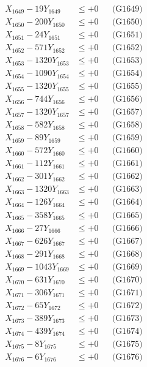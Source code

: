 \documentclass[a4paper,10pt]{article}
\begin{document}
{\begin{align}
X_{1649} - 19Y_{1649} &\leq +0 && \text{(G1649)} \\
X_{1650} - 200Y_{1650} &\leq +0 && \text{(G1650)} \\
\allowbreak
X_{1651} - 24Y_{1651} &\leq +0 && \text{(G1651)} \\
X_{1652} - 571Y_{1652} &\leq +0 && \text{(G1652)} \\
X_{1653} - 1320Y_{1653} &\leq +0 && \text{(G1653)} \\
X_{1654} - 1090Y_{1654} &\leq +0 && \text{(G1654)} \\
X_{1655} - 1320Y_{1655} &\leq +0 && \text{(G1655)} \\
X_{1656} - 744Y_{1656} &\leq +0 && \text{(G1656)} \\
X_{1657} - 1320Y_{1657} &\leq +0 && \text{(G1657)} \\
X_{1658} - 582Y_{1658} &\leq +0 && \text{(G1658)} \\
X_{1659} - 89Y_{1659} &\leq +0 && \text{(G1659)} \\
X_{1660} - 572Y_{1660} &\leq +0 && \text{(G1660)} \\
\allowbreak
X_{1661} - 112Y_{1661} &\leq +0 && \text{(G1661)} \\
X_{1662} - 301Y_{1662} &\leq +0 && \text{(G1662)} \\
X_{1663} - 1320Y_{1663} &\leq +0 && \text{(G1663)} \\
X_{1664} - 126Y_{1664} &\leq +0 && \text{(G1664)} \\
X_{1665} - 358Y_{1665} &\leq +0 && \text{(G1665)} \\
X_{1666} - 27Y_{1666} &\leq +0 && \text{(G1666)} \\
X_{1667} - 626Y_{1667} &\leq +0 && \text{(G1667)} \\
X_{1668} - 291Y_{1668} &\leq +0 && \text{(G1668)} \\
X_{1669} - 1043Y_{1669} &\leq +0 && \text{(G1669)} \\
X_{1670} - 631Y_{1670} &\leq +0 && \text{(G1670)} \\
\allowbreak
X_{1671} - 306Y_{1671} &\leq +0 && \text{(G1671)} \\
X_{1672} - 65Y_{1672} &\leq +0 && \text{(G1672)} \\
X_{1673} - 389Y_{1673} &\leq +0 && \text{(G1673)} \\
X_{1674} - 439Y_{1674} &\leq +0 && \text{(G1674)} \\
X_{1675} - 8Y_{1675} &\leq +0 && \text{(G1675)} \\
X_{1676} - 6Y_{1676} &\leq +0 && \text{(G1676)} \\

\end{align}}
\end{document}
